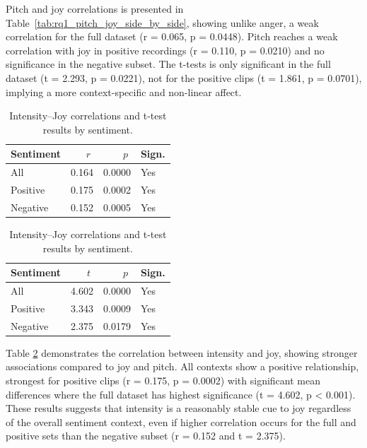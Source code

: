   Pitch and joy correlations is presented in Table~\ref{tab:rq1_pitch_joy_side_by_side}, showing unlike anger, a weak correlation for the full dataset (r = 0.065, p = 0.0448). 
  Pitch reaches a weak correlation with joy in positive recordings (r = 0.110, p = 0.0210) and no significance in the negative subset. 
  The t-tests is only significant in the full dataset (t = 2.293, p = 0.0221), not for the positive clips (t = 1.861, p = 0.0701), implying a more context-specific and non-linear affect.
  
  \begin{table}[H]
    \centering
  
    \begin{subtable}{0.45\textwidth}
      \centering
      \caption{Intensity and Joy (r)}\label{tab:rq1_corr_intensity_joy}
      \begin{tabular}{l r r l}
        \toprule
        Sentiment & \(\;r\;\) & \(\;p\;\) & Sign. \\
        \midrule
        All        & 0.164        & 0.0000    & Yes         \\
        Positive   & 0.175        & 0.0002    & Yes         \\
        Negative   & 0.152        & 0.0005    & Yes         \\
        \bottomrule
      \end{tabular}
    \end{subtable}\hfill
    \begin{subtable}{0.45\textwidth}
      \centering
      \caption{Intensity and Joy (t-test)}\label{tab:rq1_ttest_intensity_joy}
      \begin{tabular}{l r r l}
        \toprule
        Sentiment & \(\;t\;\) & \(\;p\;\) & Sign. \\
        \midrule
        All        & 4.602        & 0.0000    & Yes         \\
        Positive   & 3.343        & 0.0009    & Yes         \\
        Negative   & 2.375        & 0.0179    & Yes         \\

        \bottomrule
      \end{tabular}
    \end{subtable}
  
    \caption{Intensity–Joy correlations and t-test results by sentiment.}
    \label{tab:rq1_intensity_joy_side_by_side}
  \end{table}
Table \ref{tab:rq1_intensity_joy_side_by_side} demonstrates the correlation between intensity and joy, showing stronger associations compared to joy and pitch. 
All contexts show a positive relationship, strongest for positive clips (r = 0.175, p = 0.0002) with significant mean differences where the full dataset has highest significance (t = 4.602, p < 0.001). 
These results suggests that intensity is a reasonably stable cue to joy regardless of the overall sentiment context, even if higher correlation occurs for the full and positive sets than the negative subset (r = 0.152 and t = 2.375). 

